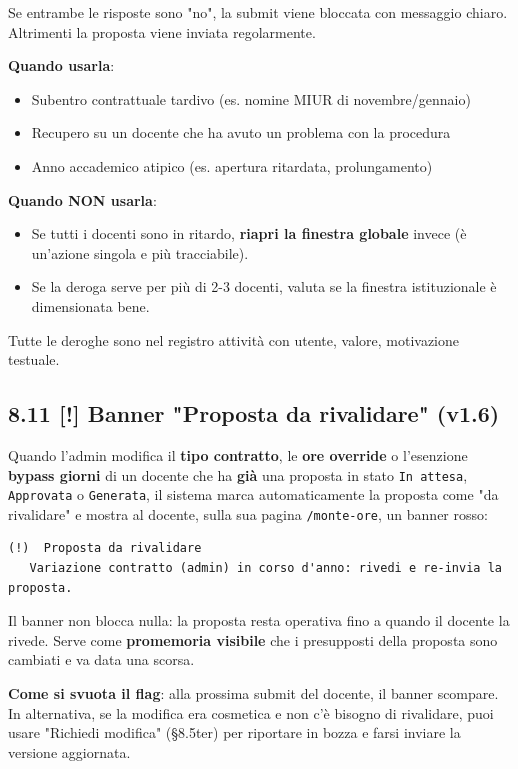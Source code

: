 \documentclass[11pt,a4paper]{article}
\begin{document}
Se entrambe le risposte sono "no", la submit viene bloccata con messaggio chiaro. Altrimenti la proposta viene inviata regolarmente.

\textbf{Quando usarla}:

\begin{itemize}
  \item Subentro contrattuale tardivo (es. nomine MIUR di novembre/gennaio)
  \item Recupero su un docente che ha avuto un problema con la procedura
  \item Anno accademico atipico (es. apertura ritardata, prolungamento)
\end{itemize}

\textbf{Quando NON usarla}:

\begin{itemize}
  \item Se tutti i docenti sono in ritardo, \textbf{riapri la finestra globale} invece (è un'azione singola e più tracciabile).
  \item Se la deroga serve per più di 2-3 docenti, valuta se la finestra istituzionale è dimensionata bene.
\end{itemize}

Tutte le deroghe sono nel registro attività con utente, valore, motivazione testuale.

\subsection{8.11 \textbf{[!]} Banner "Proposta da rivalidare" (v1.6)}


Quando l'admin modifica il \textbf{tipo contratto}, le \textbf{ore override} o l'esenzione \textbf{bypass giorni} di un docente che ha \textbf{già} una proposta in stato \texttt{In attesa}, \texttt{Approvata} o \texttt{Generata}, il sistema marca automaticamente la proposta come "da rivalidare" e mostra al docente, sulla sua pagina \texttt{/monte-ore}, un banner rosso:

\begin{lstlisting}
(!)  Proposta da rivalidare
   Variazione contratto (admin) in corso d'anno: rivedi e re-invia la proposta.
\end{lstlisting}

Il banner non blocca nulla: la proposta resta operativa fino a quando il docente la rivede. Serve come \textbf{promemoria visibile} che i presupposti della proposta sono cambiati e va data una scorsa.

\textbf{Come si svuota il flag}: alla prossima submit del docente, il banner scompare. In alternativa, se la modifica era cosmetica e non c'è bisogno di rivalidare, puoi usare "Richiedi modifica" (§8.5ter) per riportare in bozza e farsi inviare la versione aggiornata.
\end{document}
